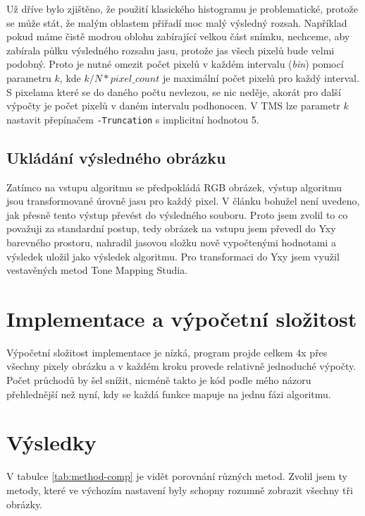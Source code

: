 \documentclass[11pt,a4paper,oneside]{article}
\begin{document}
Už dříve bylo zjištěno, že použití klasického histogramu je problematické,
protože se může stát, že malým oblastem přiřadí moc malý výsledný rozsah.
Například pokud máme čistě modrou oblohu zabírající velkou část snímku,
nechceme, aby zabírala půlku výsledného rozsahu jasu, protože jas všech pixelů
bude velmi podobný. Proto je nutné
omezit počet pixelů v každém intervalu (\textit{bin}) pomocí parametru $ k $, kde
$k/N*pixel\_count$ je maximální počet pixelů pro každý interval. S pixelama které
se do daného počtu nevlezou, se nic neděje, akorát pro další výpočty je počet
pixelů v daném intervalu podhonocen. V TMS lze parametr $ k $ nastavit přepínačem
\texttt{-Truncation} s implicitní hodnotou 5.

\subsection{Ukládání výsledného obrázku}

Zatímco na vstupu algoritmu se předpokládá RGB obrázek, výstup algoritmu jsou
transformované úrovně jasu pro každý pixel. V článku bohužel není uvedeno, jak
přesně tento výstup převést do výsledného souboru. Proto jsem zvolil to co
považuji za standardní postup, tedy obrázek na vstupu jsem převedl do Yxy barevného
prostoru, nahradil jasovou složku nově vypočtenými hodnotami a výsledek uložil
jako výsledek algoritmu. Pro transformaci do Yxy jsem využil vestavěných metod
Tone Mapping Studia.

\section{Implementace a výpočetní složitost}

Výpočetní složitost implementace je nízká, program projde celkem 4x
přes všechny pixely obrázku a v každém kroku provede relativně jednoduché výpočty. 
Počet průchodů by šel snížit, nicméně takto je kód podle mého názoru
přehlednější než nyní, kdy se každá funkce mapuje na jednu fázi algoritmu.

\section{Výsledky}


V tabulce \ref{tab:method-comp} je vidět porovnání různých metod. Zvolil jsem ty
metody, které ve výchozím nastavení byly schopny rozumně zobrazit všechny tři
obrázky.
\end{document}
